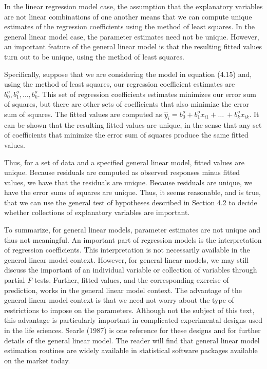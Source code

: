In the linear regression model case, the assumption that the
explanatory variables are not linear combinations of one another
means that we can compute unique estimates of the regression
coefficients using the method of least squares. In the general
linear model case, the parameter estimates need not be unique.
However, an important feature of the general linear model is that
the resulting fitted values turn out to be unique, using the method
of least squares.

Specifically, suppose that we are considering the model in equation
(4.15) and, using the method of least squares, our regression
coefficient estimates are $b_0^{o},b_1^{o},\ldots ,b_k^{o}$. This
set of regression coefficients estimates minimizes our error sum of
squares, but there are other sets of coefficients that also minimize
the error sum of squares. The fitted values are computed as
$\hat{y}_i=b_0^{o}+b_1^{o}x_{i1}+\ldots \ +b_k^{o}x_{ik}$. It can be
shown that the resulting fitted values are unique, in the sense that
any set of coefficients that minimize the error sum of squares
produce the same fitted values.

Thus, for a set of data and a specified general linear model, fitted
values are unique. Because residuals are computed as observed
responses minus fitted values, we have that the residuals are
unique. Because residuals are unique, we have the error sums of
squares are unique. Thus, it seems reasonable, and is true, that we
can use the general test of hypotheses described in Section 4.2 to
decide whether collections of explanatory variables are important.

To summarize, for general linear models, parameter estimates are not
unique and thus not meaningful. An important part of regression
models is the interpretation of regression coefficients. This
interpretation is not necessarily available in the general linear
model context. However, for general linear models, we may still
discuss the important of an individual variable or collection of
variables through partial \textit{F}-tests. Further, fitted values,
and the corresponding exercise of prediction, works in the general
linear model context. The advantage of the general linear model
context is that we need not worry about the type of restrictions to
impose on the parameters. Although not the subject of this text,
this advantage is particularly important in complicated experimental
designs used in the life sciences. Searle (1987) is one reference
for these designs and for further details of the general linear
model. The reader will find that general linear model estimation
routines are widely available in statistical software packages
available on the market today.



